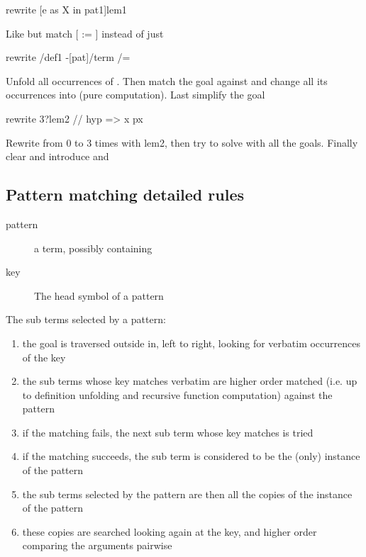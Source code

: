 \begin{landscape}
\begin{small}
\begin{multicols*}{3}[\begin{center}\section*{}\end{center}]
\begin{cheat}
rewrite [e as X in pat1]lem1
\end{cheat}
  Like  but match
  [ := ] instead of just 

\begin{cheat}
rewrite /def1 -[pat]/term /=
\end{cheat}
  Unfold all occurrences of . Then match the goal against 
  and change all its occurrences into  (pure computation). Last
  simplify the goal

\begin{cheat}
rewrite 3?lem2 // {hyp} => x px
\end{cheat}
  Rewrite from 0 to 3 times with lem2, then
  try to solve with  all the goals. Finally clear 
  and introduce  and 

\subsection*{Pattern matching detailed rules}

\begin{description}
\item[pattern] a term, possibly containing \C{_}
\item[key] The head symbol of a pattern
\end{description}

The sub terms selected by a pattern:
\begin{enumerate}
\item the goal is traversed outside in, left to right, looking for
      verbatim occurrences of the key
\item the sub terms whose key matches verbatim are higher order
      matched (i.e. up to definition unfolding and recursive function
      computation) against the pattern
\item if the matching fails, the next sub term whose key matches is tried
\item if the matching succeeds, the sub term is considered to be the
      (only) instance of the pattern
\item the sub terms selected by the pattern are then all the copies of the
      instance of the pattern
\item these copies are searched looking again at the key, and higher order
      comparing the arguments pairwise
\end{enumerate}


\end{multicols*}
\end{small}
\end{landscape}
